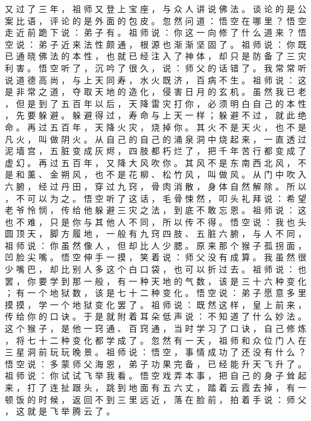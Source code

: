 {又 过 了 三 年 ， 祖 师 又 登 上 宝 座 ， 与 众 人 讲 说 佛 法 。
谈 论 的 是 公 案 比 语 ， 评 论 的 是 外 面 的 包 皮 。
忽 然 问 道 ： 悟 空 在 哪 里 ？ 悟 空 走 近 前 跪 下 说 ： 弟 子 有 。
祖 师 说 ： 你 这 一 向 修 了 什 么 道 来 ？ 悟 空 说 ： 弟 子 近 来 法 性 颇 通 ， 根 源 也 渐 渐 坚 固 了 。
祖 师 说 ： 你 既 已 通 晓 佛 法 的 本 性 ， 也 就 已 经 注 入 了 神 体 ， 却 只 是 防 备 了 三 灾 利 害 。
悟 空 听 了 ， 沉 吟 了 很 久 ， 说 ： 师 父 的 话 错 了 。
我 常 常 听 说 道 德 高 尚 ， 与 上 天 同 寿 ， 水 火 既 济 ， 百 病 不 生 。
祖 师 说 ： 这 是 非 常 之 道 ， 夺 取 天 地 的 造 化 ， 侵 害 日 月 的 玄 机 。
虽 然 我 已 老 ， 但 是 到 了 五 百 年 以 后 ， 天 降 雷 灾 打 你 ， 必 须 明 白 自 己 的 本 性 ， 先 要 躲 避 。
躲 避 得 过 ， 寿 命 与 上 天 一 样 ； 躲 避 不 过 ， 就 此 绝 命 。
再 过 五 百 年 ， 天 降 火 灾 ， 烧 掉 你 。
其 火 不 是 天 火 ， 也 不 是 凡 火 ， 叫 做 阴 火 。
从 自 己 的 自 己 的 涌 泉 洞 中 烧 起 来 ， 一 直 透 过 泥 墙 宫 ， 五 脏 变 成 灰 烬 ， 四 肢 都 朽 烂 了 ， 把 千 年 苦 行 都 变 成 了 虚 幻 。
再 过 五 百 年 ， 又 降 大 风 吹 你 。
其 风 不 是 东 南 西 北 风 ， 不 是 和 薰 、 金 朔 风 ， 也 不 是 花 柳 、 松 竹 风 ， 叫 做 风 。
从 门 中 吹 入 六 腑 ， 经 过 丹 田 ， 穿 过 九 窍 ， 骨 肉 消 散 ， 身 体 自 然 解 除 。
所 以 ， 不 可 以 为 之 。
悟 空 听 了 这 话 ， 毛 骨 悚 然 ， 叩 头 礼 拜 说 ： 希 望 老 爷 怜 悯 ， 传 给 他 躲 避 三 灾 之 法 ， 到 底 不 敢 忘 恩 。
祖 师 说 ： 这 也 不 难 ， 只 是 你 与 其 他 人 不 同 ， 所 以 传 不 得 。
悟 空 说 ： 我 也 头 圆 顶 天 ， 脚 方 履 地 ， 一 般 有 九 窍 四 肢 、 五 脏 六 腑 ， 与 人 不 同 ， 祖 师 说 ： 你 虽 然 像 人 ， 但 却 比 人 少 腮 。
原 来 那 个 猴 子 孤 拐 面 ， 凹 脸 尖 嘴 。
悟 空 伸 手 一 摸 ， 笑 着 说 ： 师 父 没 有 成 算 。
我 虽 然 很 少 嘴 巴 ， 却 比 别 人 多 这 个 白 口 袋 ， 也 可 以 折 过 去 。
祖 师 说 ： 也 罢 ， 你 要 学 到 那 一 般 ， 有 一 种 天 地 的 气 数 ， 该 是 三 十 六 种 变 化 ； 有 一 个 地 狱 数 ， 该 是 七 十 二 种 变 化 。
悟 空 说 ： 弟 子 愿 意 多 里 摸 摸 ， 学 一 个 地 狱 变 化 罢 了 。
祖 师 说 ： 既 然 这 样 ， 皇 上 前 来 ， 传 给 你 的 口 诀 。
于 是 就 附 着 耳 朵 低 声 说 ： 不 知 道 了 什 么 妙 法 。
这 个 猴 子 ， 是 他 一 窍 通 、 百 窍 通 ， 当 时 学 习 了 口 诀 ， 自 己 修 炼 ， 将 七 十 二 种 变 化 都 学 成 了 。
忽 然 有 一 天 ， 祖 师 和 众 位 门 人 在 三 星 洞 前 玩 玩 晚 景 。
祖 师 说 ： 悟 空 ， 事 情 成 功 了 还 没 有 什 么 ？ 悟 空 说 ： 多 蒙 师 父 海 恩 ， 弟 子 功 果 完 备 ， 已 经 能 升 天 飞 升 了 。
祖 师 说 ： 你 试 试 飞 举 我 看 。
悟 空 戏 弄 本 事 ， 把 自 己 的 身 子 耸 起 来 ， 打 了 连 扯 跟 头 ， 跳 到 地 面 有 五 六 丈 ， 踏 着 云 霞 去 掉 ， 有 一 顿 饭 的 时 候 ， 返 回 不 到 三 里 远 近 ， 落 在 脸 前 ， 拍 着 手 说 ： 师 父 ， 这 就 是 飞 举 腾 云 了 。
}
